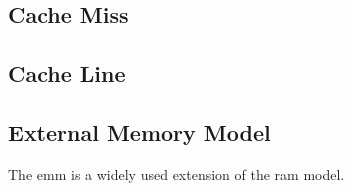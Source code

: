 \documentclass[a4paper]{scrartcl}
\begin{document}
\subsection{Cache Miss}

\subsection{Cache Line} %

\subsection{External Memory Model}
The \gls{emm} is a widely used
extension of the \gls{ram} model.

\clearpage

\printglossary[type=\acronymtype] %

\printbibliography[heading=bibintoc]
\end{document}
